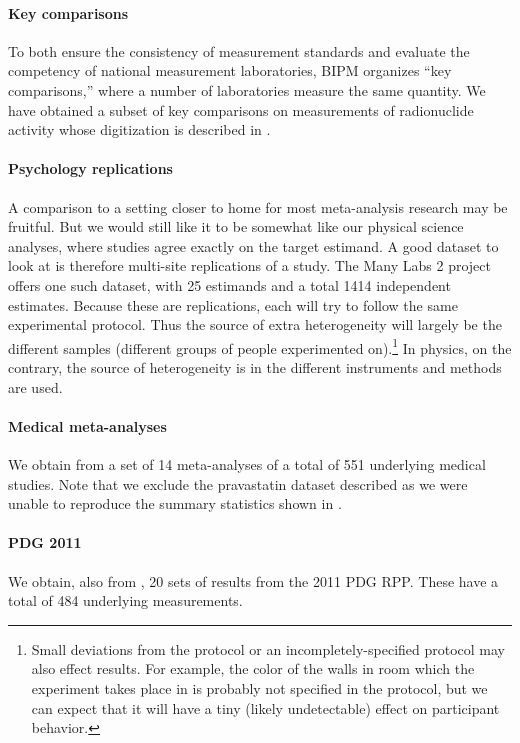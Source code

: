 \documentclass[letterpaper,12pt]{article}
\begin{document}
\paragraph{Key comparisons} To both ensure the consistency of measurement standards and evaluate the competency of national measurement laboratories, BIPM organizes ``key comparisons,'' where a number of laboratories measure the same quantity. We have obtained a subset of key comparisons on measurements of radionuclide activity whose digitization is described in \cite{coulon2021digitalization}.

\paragraph{Psychology replications} A comparison to a setting closer to home for most meta-analysis research may be fruitful. But we would still like it to be somewhat like our physical science analyses, where studies agree exactly on the target estimand. A good dataset to look at is therefore multi-site replications of a study. The Many Labs 2 project \citep{klein2018many} offers one such dataset, with 25 estimands and a total 1414 independent estimates. Because these are replications, each will try to follow the same experimental protocol. Thus the source of extra heterogeneity will largely be the different samples (different groups of people experimented on).\footnote{Small deviations from the protocol or an incompletely-specified protocol may also effect results. For example, the color of the walls in room which the experiment takes place in is probably not specified in the protocol, but we can expect that it will have a tiny (likely undetectable) effect on participant behavior.} In physics, on the contrary, the source of heterogeneity is in the different instruments and methods are used.


\paragraph{Medical meta-analyses} We obtain from \citet{baker2013meta} a set of 14 meta-analyses of a total of 551 underlying medical studies. Note that we exclude the pravastatin dataset described as we were unable to reproduce the summary statistics shown in \citet{baker2013meta}.

\paragraph{PDG 2011} We obtain, also from \citet{baker2013meta}, 20 sets of results from the 2011 PDG RPP. These have a total of 484 underlying measurements.
\end{document}
